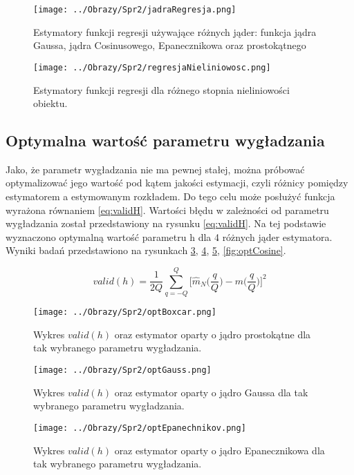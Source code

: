 \documentclass[12pt,a4paper]{article}
\begin{document}
\begin{figure}[H]
\centering
\texttt{[image: ../Obrazy/Spr2/jadraRegresja.png]} 
\caption{Estymatory funkcji regresji używające różnych jąder: funkcja jądra Gaussa, jądra Cosinusowego, Epanecznikowa oraz prostokątnego}
\label{fig:regresjiJadra}
\end{figure}


\begin{figure}[H]
\centering
\texttt{[image: ../Obrazy/Spr2/regresjaNieliniowosc.png]} 
\caption{Estymatory funkcji regresji dla różnego stopnia nieliniowości obiektu.}
\label{fig:regresjaNieliniowosc}
\end{figure}

\subsection{Optymalna wartość parametru wygładzania}
Jako, że parametr wygładzania nie ma pewnej stałej, można próbować optymalizować jego wartość pod kątem jakości estymacji, czyli różnicy pomiędzy estymatorem a estymowanym rozkładem.
Do tego celu może posłużyć funkcja wyrażona równaniem \ref{eq:validH}.
Wartości błędu w zależności od parametru wygładzania został przedstawiony na rysunku \ref{eq:validH}.
Na tej podstawie wyznaczono optymalną wartość parametru h dla 4 różnych jąder estymatora.
Wyniki badań przedstawiono na rysunkach \ref{fig:optBoxcar}, \ref{fig:optGauss}, \ref{fig:optEpanechnikov}, \ref{fig:optCosine}.

\begin{equation}\label{eq:validH}
valid(h)=\frac{1}{2Q}\sum\limits_{q=-Q}^{Q}\bigg[\hat{m}_{N}\bigg(\frac{q}{Q}\bigg)-m\bigg(\frac{q}{Q}\bigg)\bigg]^{2}
\end{equation}

\begin{figure}[H]
\centering
\texttt{[image: ../Obrazy/Spr2/optBoxcar.png]} 
\caption{Wykres $valid(h)$ oraz estymator oparty o jądro prostokątne dla tak wybranego parametru wygładzania.}
\label{fig:optBoxcar}
\end{figure}

\begin{figure}[H]
\centering
\texttt{[image: ../Obrazy/Spr2/optGauss.png]} 
\caption{Wykres $valid(h)$ oraz estymator oparty o jądro Gaussa dla tak wybranego parametru wygładzania.}
\label{fig:optGauss}
\end{figure}

\begin{figure}[H]
\centering
\texttt{[image: ../Obrazy/Spr2/optEpanechnikov.png]} 
\caption{Wykres $valid(h)$ oraz estymator oparty o jądro Epanecznikowa dla tak wybranego parametru wygładzania.}
\label{fig:optEpanechnikov}
\end{figure}
\end{document}
